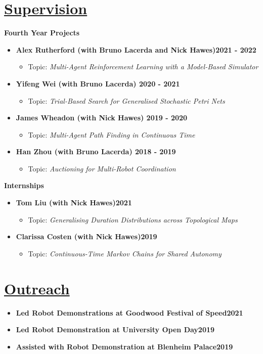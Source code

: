 \documentclass[11pt]{article}
\begin{document}
\section*{\underline{Supervision}}
\noindent \textbf{Fourth Year Projects}
\begin{itemize}
\item \textbf{Alex Rutherford (with Bruno Lacerda and Nick Hawes)\hfill 2021 - 2022}
\begin{itemize}
\item Topic: \emph{Multi-Agent Reinforcement Learning with a Model-Based Simulator}
\end{itemize}
\item \textbf{Yifeng Wei (with Bruno Lacerda) \hfill 2020 - 2021}
\begin{itemize}
\item Topic: \emph{Trial-Based Search for Generalised Stochastic Petri Nets}
\end{itemize} 
\item \textbf{James Wheadon (with Nick Hawes) \hfill 2019 - 2020}
\begin{itemize}
\item  Topic: \emph{Multi-Agent Path Finding in Continuous Time}
\end{itemize}
\item \textbf{Han Zhou (with Bruno Lacerda) \hfill 2018 - 2019}
\begin{itemize}
\item Topic: \emph{Auctioning for Multi-Robot Coordination}
\end{itemize}
\end{itemize}

\noindent \textbf{Internships}	
\begin{itemize}
\item \textbf{Tom Liu (with Nick Hawes)\hfill 2021}
\begin{itemize}
\item Topic: \emph{Generalising Duration Distributions across Topological Maps}
\end{itemize}
\item \textbf{Clarissa Costen (with Nick Hawes)\hfill 2019}
\begin{itemize}
\item Topic: \emph{Continuous-Time Markov Chains for Shared Autonomy}
\end{itemize}
\end{itemize}

\section*{\underline{Outreach}}
\begin{itemize}
\item \textbf{Led Robot Demonstrations at Goodwood Festival of Speed\hfill 2021}
\item \textbf{Led Robot Demonstration at University Open Day\hfill 2019}
\item \textbf{Assisted with Robot Demonstration at Blenheim Palace\hfill 2019}
\end{itemize}
\end{document}
